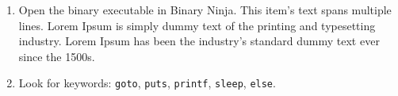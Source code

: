\begin{enumerate}
    
    \item 
    Open the binary executable in
    Binary Ninja.
    This item's text spans multiple lines.
    Lorem Ipsum is simply dummy text 
    of the printing and typesetting industry. 
    Lorem Ipsum has been 
    the industry's standard 
    dummy text ever since the 1500s.
    
    \item 
    Look for keywords:
    \texttt{goto},
    \texttt{puts},
    \texttt{printf},
    \texttt{sleep},
    \texttt{else}.
    
\end{enumerate}